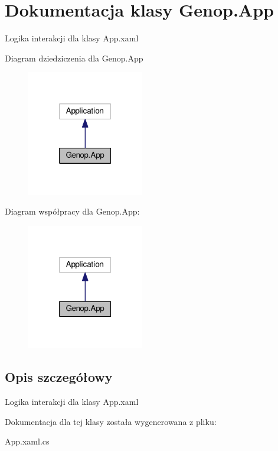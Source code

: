 \hypertarget{classGenop_1_1App}{}\section{Dokumentacja klasy Genop.\+App}
\label{classGenop_1_1App}


Logika interakcji dla klasy App.\+xaml  




Diagram dziedziczenia dla Genop.\+App
\nopagebreak
\begin{figure}[H]
\begin{center}
\leavevmode
\includegraphics[width=145pt]{d1/d9b/classGenop_1_1App__inherit__graph}
\end{center}
\end{figure}


Diagram współpracy dla Genop.\+App\+:
\nopagebreak
\begin{figure}[H]
\begin{center}
\leavevmode
\includegraphics[width=145pt]{dd/de4/classGenop_1_1App__coll__graph}
\end{center}
\end{figure}


\subsection{Opis szczegółowy}
Logika interakcji dla klasy App.\+xaml 



Dokumentacja dla tej klasy została wygenerowana z pliku\+:\begin{DoxyCompactItemize}
\item 
App.\+xaml.\+cs\end{DoxyCompactItemize}

